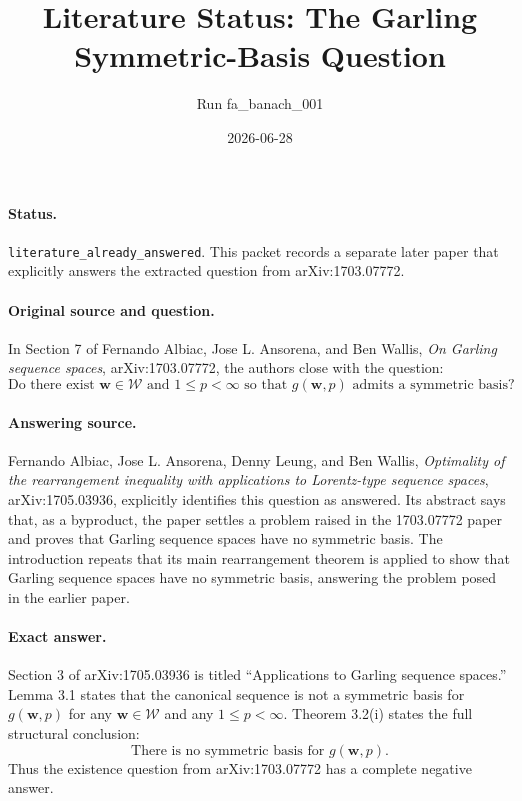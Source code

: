\documentclass[11pt]{article}
\title{Literature Status: The Garling Symmetric-Basis Question}
\author{Run fa\_banach\_001}
\date{2026-06-28}
\begin{document}
\maketitle

\paragraph{Status.}
\texttt{literature\_already\_answered}.  This packet records a separate later
paper that explicitly answers the extracted question from arXiv:1703.07772.

\paragraph{Original source and question.}
In Section 7 of Fernando Albiac, Jose L. Ansorena, and Ben Wallis,
\emph{On Garling sequence spaces}, arXiv:1703.07772, the authors close with
the question:
\[
\text{Do there exist } \mathbf{w}\in\mathcal W \text{ and } 1\le p<\infty
\text{ so that } g(\mathbf{w},p) \text{ admits a symmetric basis?}
\]

\paragraph{Answering source.}
Fernando Albiac, Jose L. Ansorena, Denny Leung, and Ben Wallis,
\emph{Optimality of the rearrangement inequality with applications to
Lorentz-type sequence spaces}, arXiv:1705.03936, explicitly identifies this
question as answered.  Its abstract says that, as a byproduct, the paper
settles a problem raised in the 1703.07772 paper and proves that Garling
sequence spaces have no symmetric basis.  The introduction repeats that
its main rearrangement theorem is applied to show that Garling sequence spaces
have no symmetric basis, answering the problem posed in the earlier paper.

\paragraph{Exact answer.}
Section 3 of arXiv:1705.03936 is titled ``Applications to Garling sequence
spaces.''  Lemma 3.1 states that the canonical sequence is not a symmetric
basis for $g(\mathbf{w},p)$ for any $\mathbf{w}\in\mathcal W$ and any
$1\le p<\infty$.  Theorem 3.2(i) states the full structural conclusion:
\[
\text{There is no symmetric basis for } g(\mathbf{w},p).
\]
Thus the existence question from arXiv:1703.07772 has a complete negative
answer.
\end{document}
